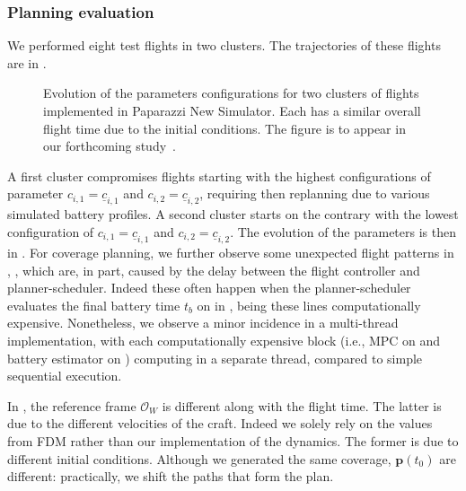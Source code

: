 \subsubsection*{Planning evaluation}

We performed eight test flights in two clusters. The trajectories of these flights are in . 
\begin{figure}[h!]
  \centering
  \selectfont
  \footnotesize    
  
  \caption[Evolution of the parameters configurations in Paparazzi New Simulator]{Evolution of the parameters configurations for two clusters of flights implemented in Paparazzi New Simulator. Each has a similar overall flight time due to the initial conditions. The figure is to appear in our forthcoming study~\citep{seewald202Xenergy}.}
  \label{fig:ctls-pprz}
\end{figure}
A first cluster  compromises flights starting with the highest configurations of parameter $c_{i,1}=\underline{c}_{i,1}$ and $c_{i,2}=\underline{c}_{i,2}$, requiring then replanning due to various simulated battery profiles. A second cluster  starts on the contrary with the lowest configuration of $c_{i,1}=\underline{c}_{i,1}$ and $c_{i,2}=\underline{c}_{i,2}$. The evolution of the parameters is then in . For coverage planning, we further observe some unexpected flight patterns in , , which are, in part, caused by the delay between the flight controller and planner-scheduler. Indeed these often happen when the planner-scheduler evaluates the final battery time $t_b$ on  in , being these lines computationally expensive. Nonetheless, we observe a minor incidence in a multi-thread implementation, with each computationally expensive block (i.e., MPC on  and battery estimator on ) computing in a separate thread, compared to simple sequential execution.

In , the reference frame $\mathcal{O}_W$ is different along with the flight time. The latter is due to the different velocities of the craft. Indeed we solely rely on the values from FDM rather than our implementation of the dynamics. The former is due to different initial conditions. Although we generated the same coverage, $\mathbf{p}(t_0)$ are different: practically, we shift the paths that form the plan.

